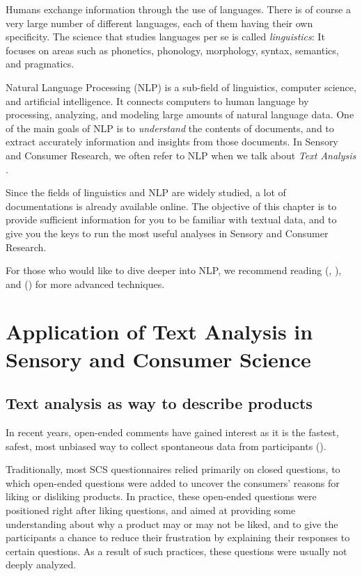 \documentclass[
]{krantz}
\begin{document}
Humans exchange information through the use of languages. There is of course a very large number of different languages, each of them having their own specificity. The science that studies languages per se is called \emph{linguistics}: It focuses on areas such as phonetics, phonology, morphology, syntax, semantics, and pragmatics.

Natural Language Processing (NLP) is a sub-field of linguistics, computer science, and artificial intelligence. It connects computers to human language by processing, analyzing, and modeling large amounts of natural language data. One of the main goals of NLP is to \emph{understand} the contents of documents, and to extract accurately information and insights from those documents. In Sensory and Consumer Research, we often refer to NLP when we talk about \emph{Text Analysis} .

Since the fields of linguistics and NLP are widely studied, a lot of documentations is already available online. The objective of this chapter is to provide sufficient information for you to be familiar with textual data, and to give you the keys to run the most useful analyses in Sensory and Consumer Research.

For those who would like to dive deeper into NLP, we recommend reading (\citet{Silge2017}, \citet{Becue-Bertaut2019}), and (\citet{Hvitfeldt2021}) for more advanced techniques.

\hypertarget{application-of-text-analysis-in-sensory-and-consumer-science}{%
\section{Application of Text Analysis in Sensory and Consumer Science}\label{application-of-text-analysis-in-sensory-and-consumer-science}}

\hypertarget{text-analysis-as-way-to-describe-products}{%
\subsection{Text analysis as way to describe products}\label{text-analysis-as-way-to-describe-products}}

In recent years, open-ended comments have gained interest as it is the fastest, safest, most unbiased way to collect spontaneous data from participants (\citet{Piqueras2015}).

Traditionally, most SCS questionnaires relied primarily on closed questions, to which open-ended questions were added to uncover the consumers' reasons for liking or disliking products. In practice, these open-ended questions were positioned right after liking questions, and aimed at providing some understanding about why a product may or may not be liked, and to give the participants a chance to reduce their frustration by explaining their responses to certain questions. As a result of such practices, these questions were usually not deeply analyzed.
\end{document}
